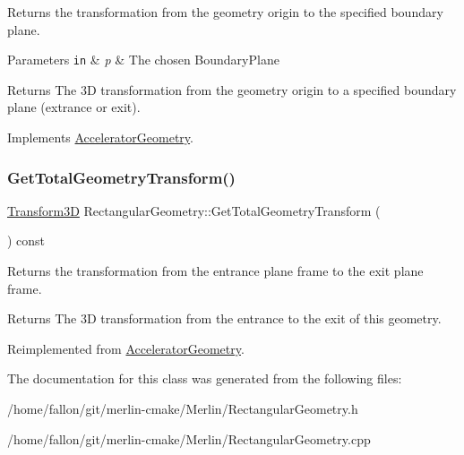 Returns the transformation from the geometry origin to the specified boundary plane. 
\begin{DoxyParams}[1]{Parameters}
\mbox{\tt in}  & {\em p} & The chosen Boundary\+Plane \\
\hline
\end{DoxyParams}
\begin{DoxyReturn}{Returns}
The 3D transformation from the geometry origin to a specified boundary plane (extrance or exit). 
\end{DoxyReturn}


Implements \hyperlink{classAcceleratorGeometry_af26654f89c4bff1b516d2c6d6bb68871}{Accelerator\+Geometry}.

\mbox{\label{classRectangularGeometry_a830506a331c8b08def936613ed727c62}} 
\subsubsection{\texorpdfstring{Get\+Total\+Geometry\+Transform()}{GetTotalGeometryTransform()}}
{\footnotesize\ttfamily \hyperlink{classTransform3D}{Transform3D} Rectangular\+Geometry\+::\+Get\+Total\+Geometry\+Transform (\begin{DoxyParamCaption}{ }\end{DoxyParamCaption}) const\hspace{0.3cm}{\ttfamily [virtual]}}

Returns the transformation from the entrance plane frame to the exit plane frame. \begin{DoxyReturn}{Returns}
The 3D transformation from the entrance to the exit of this geometry. 
\end{DoxyReturn}


Reimplemented from \hyperlink{classAcceleratorGeometry_a9bffb8262fc3b28195e1e25fbfb2b8ba}{Accelerator\+Geometry}.



The documentation for this class was generated from the following files\+:\begin{DoxyCompactItemize}
\item 
/home/fallon/git/merlin-\/cmake/\+Merlin/Rectangular\+Geometry.\+h\item 
/home/fallon/git/merlin-\/cmake/\+Merlin/Rectangular\+Geometry.\+cpp\end{DoxyCompactItemize}
